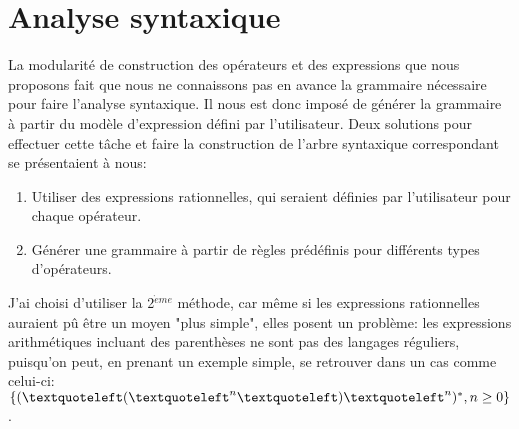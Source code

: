 \documentclass{article}
\begin{document}
\section{Analyse syntaxique}
La modularité de construction des opérateurs et des expressions que nous proposons fait que nous ne connaissons pas en avance la grammaire nécessaire pour faire l'analyse syntaxique. Il nous est donc imposé de générer la grammaire à partir du modèle d'expression défini par l'utilisateur.
Deux solutions pour effectuer cette tâche et faire la construction de l'arbre syntaxique correspondant se présentaient à nous:
\begin{enumerate}
	\item Utiliser des expressions rationnelles, qui seraient définies par l'utilisateur pour chaque opérateur.
	\item Générer une grammaire à partir de règles prédéfinis pour différents types d'opérateurs.
\end{enumerate}
J'ai choisi d'utiliser la 2$^{\grave{e}me}$ méthode, car même si les expressions rationnelles auraient pû être un moyen "plus simple", elles posent un problème: les expressions arithmétiques incluant des parenthèses ne sont pas des langages réguliers, puisqu'on peut, en prenant un exemple simple, se retrouver dans un cas comme celui-ci: $\{(\textquoteleft(\textquoteleft^{n}\textquoteleft)\textquoteleft^{n})^{*}, n \ge 0 \}$.
\end{document}
